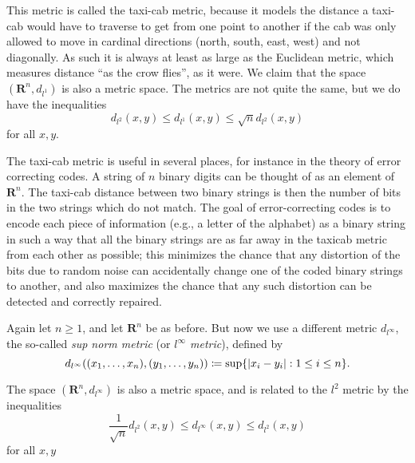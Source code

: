 \begin{note}
    This metric is called the taxi-cab metric, because it models the distance a taxi-cab would have to traverse to get from one point to another if the cab was only allowed to move in cardinal directions (north, south, east, west) and not diagonally.
    As such it is always at least as large as the Euclidean metric, which measures distance ``as the crow flies'', as it were.
    We claim that the space \((\mathbf{R}^n, d_{l^1})\) is also a metric space.
    The metrics are not quite the same, but we do have the inequalities
    \[
        d_{l^2}(x, y) \leq d_{l^1}(x, y) \leq \sqrt{n} d_{l^2}(x, y)
    \]
    for all \(x, y\).
\end{note}

\begin{remark}\label{1.1.8}
    The taxi-cab metric is useful in several places, for instance in the theory of error correcting codes.
    A string of \(n\) binary digits can be thought of as an element of \(\mathbf{R}^n\).
    The taxi-cab distance between two binary strings is then the number of bits in the two strings which do not match.
    The goal of error-correcting codes is to encode each piece of information (e.g., a letter of the alphabet) as a binary string in such a way that all the binary strings are as far away in the taxicab metric from each other as possible;
    this minimizes the chance that any distortion of the bits due to random noise can accidentally change one of the coded binary strings to another, and also maximizes the chance that any such distortion can be detected and correctly repaired.
\end{remark}

\begin{example}\label{1.1.9}
    Again let \(n \geq 1\), and let \(\mathbf{R}^n\) be as before.
    But now we use a different metric \(d_{l^\infty}\), the so-called \emph{sup norm metric} (or \emph{\(l^\infty\) metric}), defined by
    \[
        d_{l^\infty} ((x_1, \dots, x_n), (y_1, \dots, y_n)) \coloneqq \sup\{\abs*{x_i - y_i} : 1 \leq i \leq n\}.
    \]
\end{example}

\begin{note}
    The space \((\mathbf{R}^n, d_{l^\infty})\) is also a metric space, and is related to the \(l^2\) metric by the inequalities
    \[
        \frac{1}{\sqrt{n}} d_{l^2}(x, y) \leq d_{l^\infty}(x, y) \leq d_{l^2}(x, y)
    \]
    for all \(x, y\)
\end{note}


